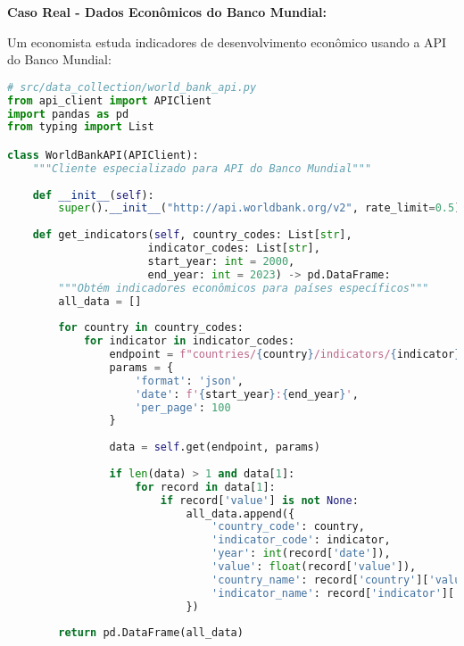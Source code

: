 \newpage

\begin{researchbox}
\textbf{Caso Real - Dados Econômicos do Banco Mundial:}

Um economista estuda indicadores de desenvolvimento econômico usando a API do Banco Mundial:

\begin{lstlisting}[language=Python]
# src/data_collection/world_bank_api.py
from api_client import APIClient
import pandas as pd
from typing import List

class WorldBankAPI(APIClient):
    """Cliente especializado para API do Banco Mundial"""
    
    def __init__(self):
        super().__init__("http://api.worldbank.org/v2", rate_limit=0.5)
        
    def get_indicators(self, country_codes: List[str], 
                      indicator_codes: List[str], 
                      start_year: int = 2000, 
                      end_year: int = 2023) -> pd.DataFrame:
        """Obtém indicadores econômicos para países específicos"""
        all_data = []
        
        for country in country_codes:
            for indicator in indicator_codes:
                endpoint = f"countries/{country}/indicators/{indicator}"
                params = {
                    'format': 'json',
                    'date': f'{start_year}:{end_year}',
                    'per_page': 100
                }
                
                data = self.get(endpoint, params)
                
                if len(data) > 1 and data[1]:
                    for record in data[1]:
                        if record['value'] is not None:
                            all_data.append({
                                'country_code': country,
                                'indicator_code': indicator,
                                'year': int(record['date']),
                                'value': float(record['value']),
                                'country_name': record['country']['value'],
                                'indicator_name': record['indicator']['value']
                            })
        
        return pd.DataFrame(all_data)

\end{lstlisting}
\end{researchbox}

